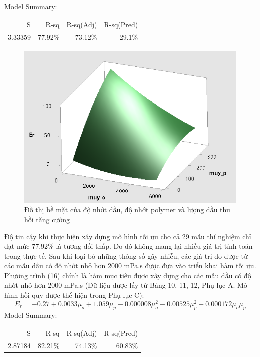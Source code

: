 \documentclass[12pt,a4paper]{article}
\begin{document}
Model Summary:
\begin{table}[h]
\begin{flushleft}
\label{my-label}
\begin{tabular}{rrrr}
S       & R-sq    & R-sq(Adj) & R-sq(Pred) \\
3.33359 & 77.92\% & 73.12\%   & 29.1\%    
\end{tabular}
\end{flushleft}
\end{table}
	\begin{figure}[h]
		\centering
		\includegraphics[scale=1]{Fig/SurfaceplotErfull.PNG}
		\caption{Đồ thị bề mặt của độ nhớt dầu, độ nhớt polymer và lượng dầu thu hồi tăng cường}
	\end{figure}
	\newline
	Độ tin cậy khi thực hiện xây dựng mô hình tối ưu cho cả 29 mẫu thí nghiệm chỉ đạt mức 77.92\% là tương đối thấp. Do đó không mang lại nhiều giá trị tính toán trong thực tế.
	\newpage
	\noindent
	Sau khi loại bỏ những thông số gây nhiễu, các giá trị đo được từ các mẫu dầu có độ nhớt nhỏ hơn 2000 mPa.s được đưa vào triển khai hàm tối ưu. Phương trình (16) chính là hàm mục tiêu được xây dựng cho các mẫu dầu có độ nhớt nhỏ hơn 2000 mPa.s (Dữ liệu được lấy từ Bảng 10, 11, 12, Phụ lục A. Mô hình hồi quy được thể hiện trong Phụ lục C):
	\begin{equation}
		E_r=-0.27+0.0033\mu_o+1.059\mu_p-0.000008\mu_o^2-0.00525\mu_p^2-0.000172\mu_o\mu_p
	\end{equation}
Model Summary:
\begin{table}[h]
\begin{flushleft}
\label{my-label}
\begin{tabular}{rrrr}
S       & R-sq    & R-sq(Adj) & R-sq(Pred) \\
2.87184 & 82.21\% & 74.13\%   & 60.83\%    
\end{tabular}
\end{flushleft}
\end{table}
\end{document}
